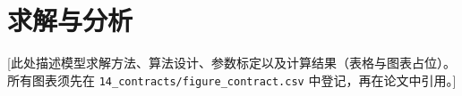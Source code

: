 \section{求解与分析}
\label{sec:solution}

[此处描述模型求解方法、算法设计、参数标定以及计算结果（表格与图表占位）。
所有图表须先在 \texttt{14_contracts/figure_contract.csv} 中登记，再在论文中引用。]
